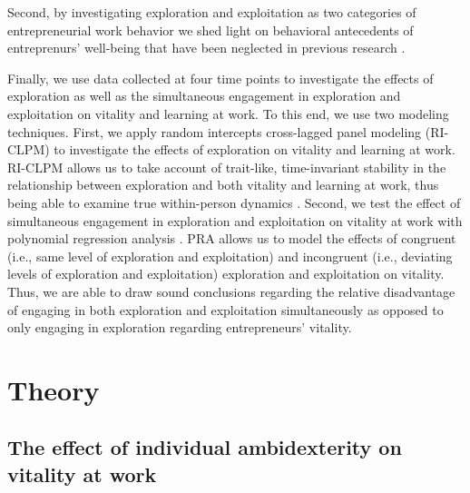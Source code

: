 \documentclass[man, 12pt, a4paper, noextraspace]{apa6}
\begin{document}
Second, by investigating exploration and exploitation as two categories of entrepreneurial work behavior we shed light on behavioral antecedents of entreprenurs' well-being that have been neglected in previous research \parencite[see][]{Stephan2018}. \par 

Finally, we use data collected at four time points to investigate the effects of exploration as well as the simultaneous engagement in exploration and exploitation on vitality and learning at work.
To this end, we use two modeling techniques. 
First, we apply random intercepts cross-lagged panel modeling (RI-CLPM) to investigate the effects of exploration on vitality and learning at work. 
RI-CLPM allows us to take account of trait-like, time-invariant stability in the relationship between exploration and both vitality and learning at work, thus being able to examine true within-person dynamics \parencite{Hamaker.2015}. 
Second, we test the effect of simultaneous engagement in exploration and exploitation on vitality at work with polynomial regression analysis \parencite[PRA;][]{Edwards.1993a, Schonbrodt2018, Humberg2019}. 
PRA allows us to model the effects of congruent (i.e., same level of exploration and exploitation) and incongruent (i.e., deviating levels of exploration and exploitation) exploration and exploitation on vitality. Thus, we are able to draw sound conclusions regarding the relative disadvantage of engaging in both exploration and exploitation simultaneously as opposed to only engaging in exploration regarding entrepreneurs' vitality. 

\section{Theory}

\subsection{The effect of individual ambidexterity on vitality at work}
\end{document}
